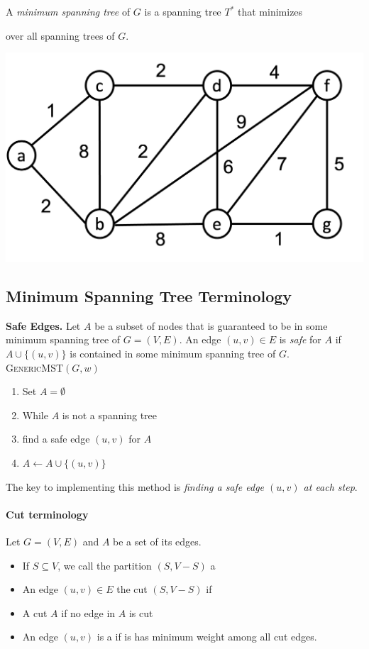 \documentclass[11  pt]{exam}
\begin{document}
A \emph{minimum spanning tree} of $G$ is a spanning tree $T^*$ that minimizes

\vs{2cm}
over all spanning trees of $G$.

\begin{center}
	\includegraphics[width = .5\linewidth]{mst-graph.png}
\end{center}

\newpage
\subsection{Minimum Spanning Tree Terminology}
\textbf{Safe Edges.} Let $A$ be a subset of nodes that is guaranteed to be in some minimum spanning tree of $G = (V,E)$. An edge $(u,v) \in E$ is \emph{safe} for $A$ if $A\cup \{(u,v)\}$ is contained in some minimum spanning tree of $G$.\\

\textsc{GenericMST}$(G,w)$
\begin{enumerate}
	\item Set $A = \emptyset$
	\item While $A$ is not a spanning tree
	\item \;\;\; find a safe edge $(u,v)$ for $A$
	\item \;\;\; $A \leftarrow A \cup \{(u,v)\}$
\end{enumerate}

The key to implementing this method is \emph{finding a safe edge $(u,v)$ at each step}.\\

\paragraph{Cut terminology}
Let $G = (V,E)$ and $A$ be a set of its edges.
\begin{itemize}
	\item If $S \subseteq V$, we call the partition $(S, V-S)$ a \\
	\item An edge $(u,v) \in E$  the cut $(S, V-S)$ if  \\
	\item A cut  $A$ if no edge in $A$ is cut\\
	\item An edge $(u,v)$ is a  if is has minimum weight among all cut edges. 
\end{itemize}
\end{document}
